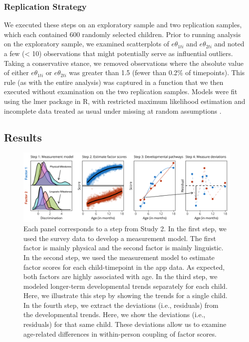 \documentclass[man, floatsintext]{apa7}
\begin{document}
\subsubsection{Replication Strategy}

We executed these steps on an exploratory sample and two replication
samples, which each contained 600 randomly selected children. Prior to
running analysis on the exploratory sample, we examined scatterplots of
$e\theta_{1ti}$ and $e\theta_{2ti}$ and noted a few (\textless{} 10)
observations that might potentially serve as influential outliers.
Taking a conservative stance, we removed observations where the absolute
value of either $e\theta_{1ti}$ or $e\theta_{2ti}$ was greater than
1.5 (fewer than 0.2\% of timepoints). This rule (as with the entire
analysis) was captured in a function that we then executed without
examination on the two replication samples. Models were fit using the
lmer package in R, with restricted maximum likelihood estimation and
incomplete data treated as usual under missing at random assumptions
\parencite{bates2005}.


\subsection{Results}


\begin{figure}[t!]
\centering
\includegraphics[width=1\columnwidth]{figures/bigfigure.png}
\caption{Each panel corresponds to a step from Study 2. In the first step, we used the survey data to develop a measurement model. The first factor is mainly physical and the second factor is mainly linguistic. In the second step, we used the measurement model to estimate factor scores for each child-timepoint in the app data. As expected, both factors are highly associated with age. In the third step, we modeled longer-term developmental trends separately for each child. Here, we illustrate this step by showing the trends for a single child. In the fourth step, we extract the deviations (i.e., residuals) from the developmental trends. Here, we show the deviations (i.e., residuals) for that same child. These deviations allow us to examine age-related differences
in within-person coupling of factor scores.}
\label{fig:study2}
\end{figure}
\end{document}
